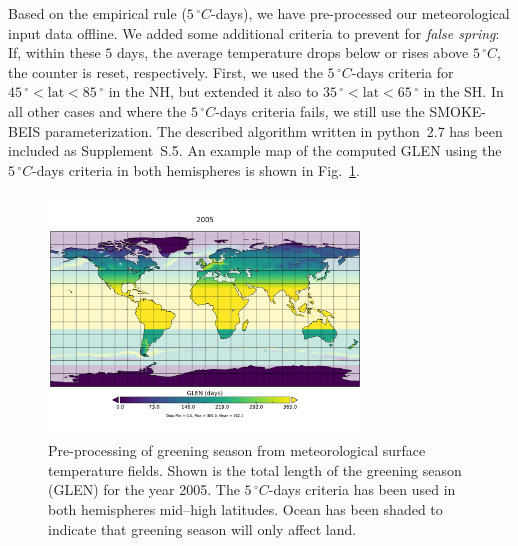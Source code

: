 \documentclass[gmd, manuscript]{copernicus}
\begin{document}
Based on the empirical rule ($5\,\unit{^\circ C}$-days), we have pre-processed our meteorological input data offline. We added some additional criteria to prevent for \emph{false spring}: If, within these $5$ days, the average temperature drops below or rises above $5\,\unit{^\circ C}$, the counter is reset, respectively. First, we used the $5\,\unit{^\circ C}$-days criteria for $45\,\unit{^\circ} < \text{lat} < 85\,\unit{^\circ}$ in the NH, but extended it also to $35\,\unit{^\circ} < \text{lat} < 65\,\unit{^\circ}$ in the SH. In all other cases and where the $5\,\unit{^\circ C}$-days criteria fails, we still use the SMOKE-BEIS parameterization. The described algorithm written in python~2.7 has been included as Supplement~S.5. An example map of the computed GLEN using the $5\,\unit{^\circ C}$-days criteria in both hemispheres is shown in Fig.~\ref{fig:glen_2015_she}.
%
\begin{figure}[t]
  \includegraphics[width=8.3cm, clip, trim={0.cm 1.75cm 0.cm 1.75cm}]{fig03}
  \caption{Pre-processing of greening season from meteorological surface temperature fields. Shown is the total length of the greening season (GLEN) for the year 2005. The $5\,\unit{^\circ C}$-days criteria has been used in both hemispheres mid--high latitudes. Ocean has been shaded to indicate that greening season will only affect land.}
  \label{fig:glen_2015_she}
\end{figure}
%
\end{document}
